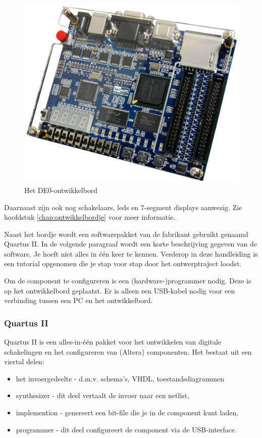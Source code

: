 \documentclass[a4paper,12pt,fleqn,twoside]{book}
\begin{document}
\begin{figure}[H]
\centering
\includegraphics[scale=0.63]{image-de0.jpg}
\caption{Het DE0-ontwikkelbord}
\label{fig:image-de0}
\end{figure}
 
Daarnaast zijn ook nog schakelaars, leds en 7-segment displays aanwezig. Zie
hoofdstuk \ref{chap:ontwikkelbordje} voor meer informatie.

Naast het bordje wordt een softwarepakket van de fabrikant gebruikt genaamd
Quartus II. In de volgende paragraaf wordt een korte beschrijving gegeven van
de software. Je hoeft niet alles in \'{e}\'{e}n keer te kennen. Verderop in
deze handleiding is een tutorial opgenomen die je stap voor stap door het
ontwerptraject loodst.

Om de component te configureren is een (hardware-)programmer nodig. Deze is op
het ontwikkelbord geplaatst. Er is alleen een USB-kabel nodig voor een
verbinding tussen een PC en het ontwikkelbord.

\subsubsection{Quartus II}
Quartus II is een alles-in-\'{e}\'{e}n pakket voor het ontwikkelen van digitale
schakelingen en het configureren van (Altera) componenten. Het bestaat uit een
viertal delen:

\begin{itemize}\itemsep-1pt
\item het invoergedeelte - d.m.v. schema's, VHDL, toestandsdiagrammen
\item synthesizer - dit deel vertaalt de invoer naar een netlist,
\item implemention - genereert een bit-file die je in de component kunt laden,
\item programmer - dit deel configureert de component via de USB-interface.
\end{itemize}
\end{document}
